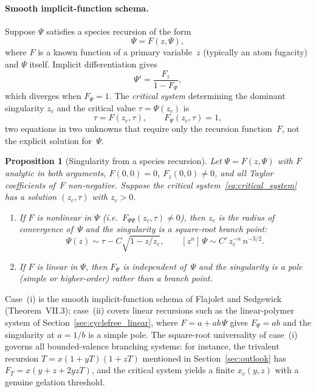 \documentclass[11pt]{amsart}
\newcommand{\GFcomb}{\Psi}
\theoremstyle{definition}
\theoremstyle{plain}
\newtheorem{proposition}{Proposition}
\theoremstyle{remark}
\begin{document}
\paragraph{Smooth implicit-function schema.}
Suppose $\GFcomb$ satisfies a species recursion of the form
\begin{equation}\label{eq:implicit_recursion}
\GFcomb = F(z,\GFcomb),
\end{equation}
where $F$ is a known function of a primary variable~$z$ (typically an atom fugacity) and $\GFcomb$ itself.
Implicit differentiation gives
\begin{equation}\label{eq:implicit_derivative}
\GFcomb' = \frac{F_z}{1 - F_{\GFcomb}},
\end{equation}
which diverges when $F_{\GFcomb}=1$.
The \emph{critical system} determining the dominant singularity $z_c$ and the critical value $\tau=\GFcomb(z_c)$ is
\begin{equation}\label{eq:critical_system}
\tau = F(z_c,\tau),
\qquad
F_{\GFcomb}(z_c,\tau)=1,
\end{equation}
two equations in two unknowns that require only the recursion function~$F$, not the explicit solution for~$\GFcomb$.

\begin{proposition}[Singularity from a species recursion]
\label{prop:implicit_singularity}
Let $\GFcomb = F(z,\GFcomb)$ with $F$ analytic in both arguments, $F(0,0)=0$, $F_z(0,0)\neq 0$, and all Taylor coefficients of~$F$ non-negative.
Suppose the critical system~\eqref{eq:critical_system} has a solution $(z_c,\tau)$ with $z_c>0$.
\begin{enumerate}
\item If $F$ is nonlinear in $\GFcomb$ (i.e.\ $F_{\GFcomb\GFcomb}(z_c,\tau)\neq 0$), then $z_c$ is the radius of convergence of~$\GFcomb$ and the singularity is a square-root branch point:
\[
\GFcomb(z) \sim \tau - C\sqrt{1-z/z_c},
\qquad
[z^n]\,\GFcomb \sim C'\,z_c^{-n}\,n^{-3/2}.
\]
\item If $F$ is linear in $\GFcomb$, then $F_{\GFcomb}$ is independent of~$\GFcomb$ and the singularity is a pole (simple or higher-order) rather than a branch point.
\end{enumerate}
\end{proposition}

Case~(i) is the smooth implicit-function schema of Flajolet and Sedgewick~\cite{flajolet2009analytic} (Theorem~VII.3); case~(ii) covers linear recursions such as the linear-polymer system of Section~\ref{sec:cyclefree_linear}, where $F=a+ab\,\GFcomb$ gives $F_{\GFcomb}=ab$ and the singularity at $a=1/b$ is a simple pole.
The square-root universality of case~(i) governs all bounded-valence branching systems: for instance, the trivalent recursion $T=x(1+yT)(1+zT)$ mentioned in Section~\ref{sec:outlook} has $F_T=x(y+z+2yzT)$, and the critical system yields a finite $x_c(y,z)$ with a genuine gelation threshold.
\end{document}
